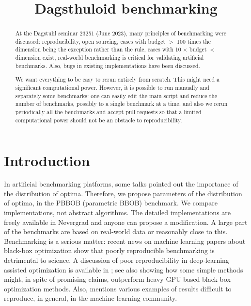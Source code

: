 \documentclass{article}
\begin{document}
\title{Dagsthuloid benchmarking}

\maketitle


\begin{abstract}
At the Dagstuhl seminar 23251 (June 2023), many principles of benchmarking were discussed: reproducibility, open sourcing, cases with budget $>$ 100 times the dimension being the exception rather than the rule, cases with 10 $\times$ budget $<$ dimension exist, real-world benchmarking is critical for validating artificial benchmarks. Also, bugs in existing implementations have been discussed.

We want everything to be easy to rerun entirely from scratch. This might need a significant computational power.
However, it is possible to run manually and separately some benchmarks: one can easily edit the main script and reduce the number of benchmarks, possibly to a single benchmark at a time, and also we rerun periodically all the benchmarks and accept pull requests so that a limited computational power should not be an obstacle to reproducibility.
\end{abstract}
\tableofcontents

\section{Introduction}

In artificial benchmarking platforms, some talks pointed out the importance of the distribution of optima. Therefore, we propose parameters of the distribution of optima, in the PBBOB (parametric BBOB) benchmark.
We compare implementations, not abstract algorithms. The detailed implementations are freely available in Nevergrad and anyone can propose a modification.
A large part of the benchmarks are based on real-world data or reasonably close to this.
Benchmarking is a serious matter: recent news on machine learning papers about black-box optimization show that poorly reproducible benchmarking is detrimental to science. 
A discussion of poor reproducibility in deep-learning assisted optimization is available in \cite{rlgoogle}; see also \cite{ecnassurvey,repronas,pham2018efficient,real2019regularized} showing how some simple methods might, in spite of promising claims, outperform heavy GPU-based black-box optimization methods. Also, \cite{leakage} mentions various examples of results difficult to reproduce, in general, in the machine learning community.
\end{document}
